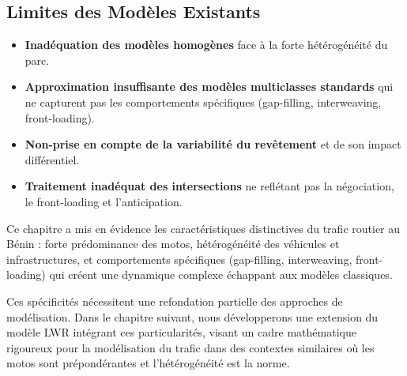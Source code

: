\subsection{Limites des Modèles Existants}
\label{subsec:limites_modeles_existants}
\begin{itemize}
    \item \textbf{Inadéquation des modèles homogènes} face à la forte hétérogénéité du parc.
    \item \textbf{Approximation insuffisante des modèles multiclasses standards} \cite{wong2002multi, chanut2005modeles} qui ne capturent pas les comportements spécifiques (gap-filling, interweaving, front-loading).
    \item \textbf{Non-prise en compte de la variabilité du revêtement} et de son impact différentiel.
    \item \textbf{Traitement inadéquat des intersections} ne reflétant pas la négociation, le front-loading et l'anticipation.
\end{itemize}



Ce chapitre a mis en évidence les caractéristiques distinctives du trafic routier au Bénin : forte prédominance des motos, hétérogénéité des véhicules et infrastructures, et comportements spécifiques (gap-filling, interweaving, front-loading) qui créent une dynamique complexe échappant aux modèles classiques.

Ces spécificités nécessitent une refondation partielle des approches de modélisation. Dans le chapitre suivant, nous développerons une extension du modèle LWR intégrant ces particularités, visant un cadre mathématique rigoureux pour la modélisation du trafic dans des contextes similaires où les motos sont prépondérantes et l'hétérogénéité est la norme.

